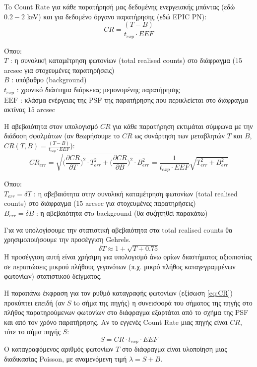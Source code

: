 To \textlatin{Count Rate} για κάθε παρατήρησή μας δεδομένης ενεργειακής μπάντας (εδώ $0.2-2$ \textlatin{keV}) και για δεδομένο όργανο παρατήρησης (εδώ \textlatin{EPIC PN})\cite{RapidXMM}:
\begin{equation} CR = \frac {(T-B)} { t_{exp}  \cdot EEF}  \label{eq:CR} \end{equation}

Όπου:\\
$T$ : η συνολική καταμέτρηση φωτονίων (\textlatin{total realised counts}) στο διάφραγμα ($15$ \textlatin{arcsec} για στοχευμένες παρατηρήσεις)\\ 
$B$ : υπόβαθρο (\textlatin{background})\\
$t_{exp}$ : χρονικό διάστημα διάρκειας μεμονομένης παρατήρησης \\
$\mbox{EEF}$ : κλάσμα ενέργειας της \textlatin{PSF} της παρατήρησης που περικλείεται στο διάφραγμα ακτίνας $15$ \textlatin{arcsec}

Η αβεβαιότητα στον υπολογισμό $CR$ για κάθε παρατήρηση εκτιμάται σύμφωνα με την διάδοση σφαλμάτων\cite{BuchnerGeorgakakis} (αν θεωρήσουμε το $CR$ ως συνάρτηση των μεταβλητών $Τ$ και $Β$, $CR(T,B) = \frac {(T-B)} { t_{exp}  \cdot EEF} $):     
  \begin{equation} CR_{err} = \sqrt{ \Big( \frac{\partial CR}{\partial T} \Big)^2 \cdot T_{err}^2  +  \Big( \frac{\partial CR}{\partial B} \Big)^2 \cdot B_{err}^2   } = \frac{1}{t_{exp} \cdot EEF} \sqrt{  T_{err}^2 + B_{err}^2    } \label{eq:CRerr} \end{equation}
  
Όπου:\\
$T_{err} = \delta T$ : η αβεβαιότητα στην συνολική καταμέτρηση φωτονίων (\textlatin{total realised counts}) στο διάφραγμα ($15$ \textlatin{arcsec} για στοχευμένες παρατηρήσεις)\\ 
$B_{err} = \delta B$ :  η αβεβαιότητα στo \textlatin{background} (θα συζητηθεί παρακάτω)

Για να υπολογίσουμε την στατιστική αβεβαιότητα στα \textlatin{total realised counts} θα χρησιμοποιήσουμε την προσέγγιση \textlatin{Gehrels}\cite{1986ApJ...303..336G}.
\begin{equation} \delta T \approx 1+\sqrt{T+0.75 } \label{eq:Gehrels} \end{equation}
Η προσέγγιση αυτή είναι χρήσιμη για υπολογισμό άνω ορίων διαστήματος αξιοπιστίας σε περιπτώσεις μικρού πλήθους γεγονότων (π.χ. μικρό πλήθος καταγεγραμμένων φωτονίων) στατιστικού δείγματος.

Η παραπάνω έκφραση για τον ρυθμό καταγραφής φωτονίων (εξίσωση \ref{eq:CR}) προκύπτει επειδή (αν $S$ to σήμα της πηγής) η συνεισφορά του σήματος της πηγής στο πλήθος παρατηρούμενων φωτονίων στο διάφραγμα εξαρτάται από το σχήμα της \textlatin{PSF} και από τον χρόνο παρατήρησης. Αν το εγγενές \textlatin{Count Rate} μιας πηγής είναι $CR$, τότε το σήμα πηγής $S$\cite{RapidXMM}:
\begin{equation}
    S = CR \cdot t_{exp}  \cdot EEF \label{eq:sourcesignal}
\end{equation}
Ο καταγραφόμενος αριθμός φωτονίων $T$ στο διάφραγμα είναι υλοποίηση μιας διαδικασίας \textlatin{Poisson}, με αναμενόμενη τιμή $\lambda = S + B$.   

